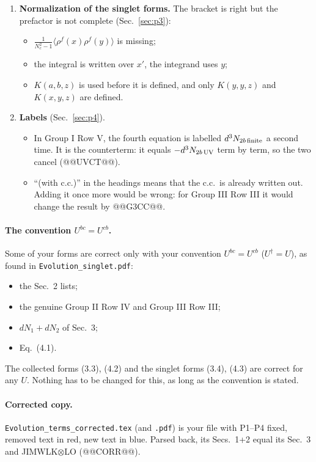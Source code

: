 \documentclass[10pt]{article}
\numberwithin{equation}{section}
\newcommand{\new}[1]{{\color{blue}#1}}
\newcommand{\old}[1]{{\color{red}#1}}
\begin{document}
\begin{enumerate}
\begin{itemize}
\end{itemize}
\item[\textbf{P3}] \textbf{Normalization of the singlet forms.} The bracket is right but the prefactor is not complete (Sec.~\ref{sec:p3}):
\begin{itemize}
\item $\frac{1}{N_c^2-1}\langle\rho^f(x)\rho^f(y)\rangle$ is missing;
\item the integral is written over $x'$, the integrand uses $y$;
\item $K(a,b,z)$ is used before it is defined, and only $K(y,y,z)$ and $K(x,y,z)$ are defined.
\end{itemize}
\item[\textbf{P4}] \textbf{Labels} (Sec.~\ref{sec:p4}).
\begin{itemize}
\item In Group I Row V, the fourth equation is labelled $d^3N_{2b\,\rm finite}$ a second time. It is the counterterm: it equals $-d^3N_{2b\,\rm UV}$ term by term, so the two cancel (@@UVCT@@).
\item ``(with c.c.)'' in the headings means that the c.c.\ is already written out. Adding it once more would be wrong: for Group III Row III it would change the result by @@G3CC@@.
\end{itemize}
\end{enumerate}

\paragraph{The convention $U^{bc}=U^{cb}$.} Some of your forms are correct only with your convention $U^{bc}=U^{cb}$ ($U^\dagger=U$), as found in \texttt{Evolution\_singlet.pdf}:
\begin{itemize}
\item the Sec.~2 lists;
\item the genuine Group II Row IV and Group III Row III;
\item $dN_1+dN_2$ of Sec.~3;
\item Eq.~(4.1).
\end{itemize}
The collected forms (3.3), (4.2) and the singlet forms (3.4), (4.3) are correct for any $U$. Nothing has to be changed for this, as long as the convention is stated.

\paragraph{Corrected copy.} \texttt{Evolution\_terms\_corrected.tex} (and \texttt{.pdf}) is your file with P1--P4 fixed, removed text in \old{red}, new text in \new{blue}. Parsed back, its Secs.~1+2 equal its Sec.~3 and JIMWLK$\otimes$LO (@@CORR@@).
\end{document}
